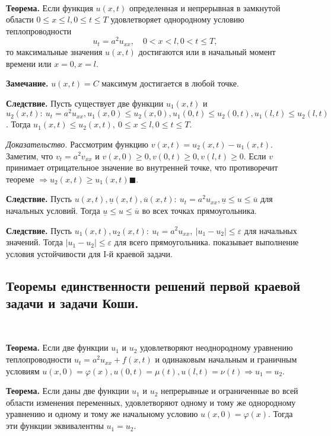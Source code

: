 \documentclass[9pt]{article}
\begin{document}
\ 
\par\textbf{Теорема.} Если функция \(u(x,t)\) определенная и непрерывная в замкнутой области \(0\le x \le l,0\le t\le T\) удовлетворяет однородному условию теплопроводности
\begin{equation}
    u_t=a^2u_{xx},\quad 0<x<l,0<t\le T,
\end{equation} то максимальные значения \(u(x,t)\) достигаются или в начальный момент времени или \(x=0,x=l\).
\par\textbf{Замечание.} \(u(x,t)=C\) максимум достигается в любой точке.
\par\textbf{Следствие.} Пусть существует две функции \(u_1(x,t)\) и \(u_2(x,t):\ u_t=a^2u_{xx},u_1(x,0)\le u_2(x,0),u_1(0,t)\le u_2(0,t),u_1(l,t)\le u_2(l,t)\). Тогда \(u_1(x,t)\le u_2(x,t),\ 0\le x\le l, 0\le t\le T\).
\par\textit{Доказательство.} Рассмотрим функцию \(v(x,t)=u_2(x,t)-u_1(x,t)\). Заметим, что \(v_t=a^2v_{xx}\) и \(v(x,0)\ge0,v(0,t)\ge0,v(l,t)\ge0\). Если \(v\) принимает отрицательное значение во внутренней точке, что противоречит теореме \(\Rightarrow u_2(x,t)\ge u_1(x,t)\blacksquare\).
\par\textbf{Следствие.} Пусть \(u(x,t),\underline u(x,t),\overline u(x,t):\ u_t=a^2u_{xx},\underline u \le u\le \overline u\) для начальных условий. Тогда \(\underline u\le u\le \overline u\) во всех точках прямоугольника.
\par\textbf{Следствие.} Пусть \(u_1(x,t),u_2(x,t):\ u_t=a^2u_{xx},\ |u_1-u_2|\le \varepsilon\) для начальных значений. Тогда \(|u_1-u_2|\le\varepsilon\) для всего прямоугольника.
\parСледствие показывает выполнение условия устойчивости для I-й краевой задачи.

\subsection{Теоремы единственности решений первой краевой задачи и задачи Коши.}

\ 
\par\textbf{Теорема.} Если две функции \(u_1\) и \(u_2\) удовлетворяют неоднородному уравнению теплопроводности \(u_t=a^2u_{xx}+f(x,t)\) и одинаковым начальным и граничным условиям \(u(x,0)=\varphi(x),u(0,t)=\mu(t),u(l,t)=\nu(t)\Rightarrow u_1=u_2\).
\par\textbf{Теорема.} Если даны две функции \(u_1\) и \(u_2\) непрерывные и ограниченные во всей области изменения переменных, удовлетворяют одному и тому же однородному уравнению и одному и тому же начальному условию \(u(x,0)=\varphi(x)\). Тогда эти функции эквивалентны \(u_1=u_2\).
\end{document}
